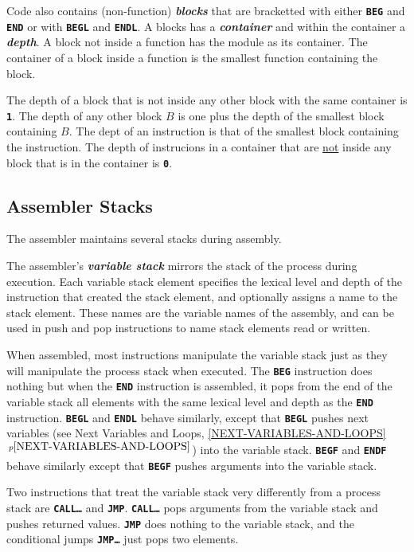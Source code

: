 \documentclass[12pt]{article}
\newcommand{\TT}[1]{{\tt \bfseries #1}}
\newcommand{\key}[1]{{\bf \em #1}\index{#1}}
\newcommand{\skey}[2]{{\bf \em #1#2}\index{#1}}
\newcommand{\itemref}[1]{\ref{#1}$\,^{p\pageref{#1}}$}
\begin{document}
Code also contains (non-function) \skey{block}s that are
bracketted with either \TT{BEG} and \TT{END} or with
\TT{BEGL} and \TT{ENDL}.  A blocks has a \key{container}
and within the container a \key{depth}.
A block not inside a function has the module as its container.
The container of a block inside a function is the smallest
function containing the block.

The depth of a block that is not inside any other block with
the same container is \TT{1}.  The depth of any other block $B$
is one plus the depth of the smallest block containing $B$.
The dept of an instruction
is that of the smallest block containing the instruction.
The depth of instrucions in a container
that are \underline{not} inside any block that is in the container
is \TT{0}.

\subsection{Assembler Stacks}
\label{ASSEMBLER-STACKS}

The assembler maintains several stacks during assembly.

The assembler's \key{variable stack} mirrors the stack of
the process during execution.  Each variable stack
element specifies the lexical level and depth of the
instruction that created the stack element, and optionally
assigns a name to the stack element.  These names are the
variable names of the assembly, and can be used in
push and pop instructions to name stack elements read or
written.

When assembled, most instructions manipulate the variable
stack just as they will manipulate the process stack
when executed.  The \TT{BEG} instruction does nothing
but when the \TT{END} instruction is assembled, it pops
from the end of the variable stack all elements with
the same lexical level and depth as the \TT{END} instruction.
\TT{BEGL} and \TT{ENDL} behave similarly, except that
\TT{BEGL} pushes next variables (see Next Variables and Loops,
\itemref{NEXT-VARIABLES-AND-LOOPS}) into the variable stack.
\TT{BEGF} and \TT{ENDF} behave similarly except that \TT{BEGF}
pushes arguments into the variable stack.

Two instructions that treat the variable stack very differently
from a process stack are \TT{CALL\ldots} and \TT{JMP}.  \TT{CALL\ldots}
pops arguments from the variable stack and pushes returned values.
\TT{JMP} does nothing to the variable stack, and the conditional
jumps \TT{JMP\ldots} just pops two elements.
\end{document}
